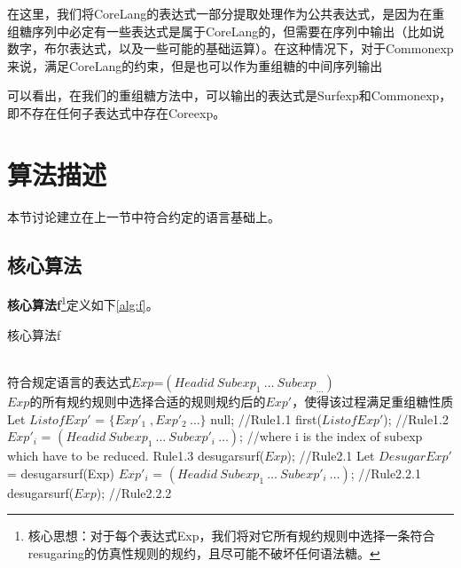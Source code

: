 在这里，我们将CoreLang的表达式一部分提取处理作为公共表达式，是因为在重组糖序列中必定有一些表达式是属于CoreLang的，但需要在序列中输出（比如说数字，布尔表达式，以及一些可能的基础运算）。在这种情况下，对于Commonexp来说，满足CoreLang的约束，但是也可以作为重组糖的中间序列输出

可以看出，在我们的重组糖方法中，可以输出的表达式是Surfexp和Commonexp，即不存在任何子表达式中存在Coreexp。


\section{算法描述}
本节讨论建立在上一节中符合约定的语言基础上。

\subsection{核心算法}

{\bfseries 核心算法f}\footnote{核心思想：对于每个表达式Exp，我们将对它所有规约规则中选择一条符合resugaring的仿真性规则的规约，且尽可能不破坏任何语法糖。}定义如下\ref{alg:f}。
\begin{algorithm}
	\caption{核心算法f}
	\label{alg:f}     %
	\begin{algorithmic}[1]       %
		\REQUIRE ~~\\      %
		符合规定语言的表达式$Exp$=$(Headid~Subexp_{1}~\ldots~Subexp_{\ldots})$
		\ENSURE ~~\\     %
		$Exp$的所有规约规则中选择合适的规则规约后的$Exp'$，使得该过程满足重组糖性质
		\STATE     Let $ListofExp'$ = $\{Exp'_{1}\;,Exp'_{2}~\ldots\}$
			\RETURN null; //\hfill Rule1.1
			\RETURN first($ListofExp'$); //\hfill Rule1.2
			\ELSE 
			\RETURN $Exp'_{i}$ = $(Headid~Subexp_{1}~\ldots~Subexp'_{i}~\ldots)$; //where i is the index of subexp which have to be reduced. \hfill Rule1.3
			\ENDIF
		\ELSE 
			\RETURN desugarsurf($Exp$); //\hfill Rule2.1
			\ELSE
				\STATE Let $DesugarExp'$ = desugarsurf(Exp)
				\RETURN $Exp'_{i}$ = $(Headid~Subexp_{1}~\ldots~Subexp'_{i}~\ldots)$; //\hfill Rule2.2.1
				\ELSE
				\RETURN desugarsurf($Exp$); //\hfill Rule2.2.2
				\ENDIF
			\ENDIF
		\ENDIF
		
	\end{algorithmic}
\end{algorithm}


